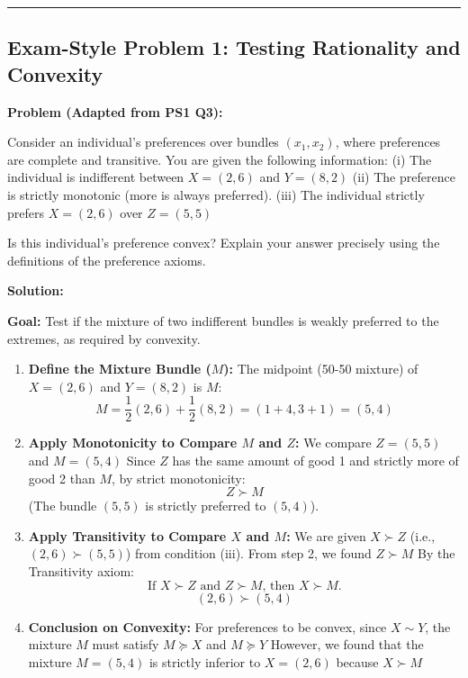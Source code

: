 \documentclass{article}
\begin{document}
\noindent\rule{\textwidth}{0.4pt}

\subsection*{Exam-Style Problem 1: Testing Rationality and Convexity}

\textbf{Problem (Adapted from PS1 Q3):}

Consider an individual's preferences over bundles $(x_1, x_2)$, where preferences are complete and transitive. You are given the following information: (i) The individual is indifferent between $X = (2, 6)$ and $Y = (8, 2)$ (ii) The preference is strictly monotonic (more is always preferred). (iii) The individual strictly prefers $X = (2, 6)$ over $Z = (5, 5)$

Is this individual's preference convex? Explain your answer precisely using the definitions of the preference axioms.

\textbf{Solution:}

\textbf{Goal:} Test if the mixture of two indifferent bundles is weakly preferred to the extremes, as required by convexity.

\begin{enumerate}
    \item \textbf{Define the Mixture Bundle ($M$):} The midpoint (50-50 mixture) of $X=(2, 6)$ and $Y=(8, 2)$ is $M$: \[M = \frac{1}{2}(2, 6) + \frac{1}{2}(8, 2) = (1+4, 3+1) = (5, 4)\]
    \item \textbf{Apply Monotonicity to Compare $M$ and $Z$:} We compare $Z=(5, 5)$ and $M=(5, 4)$ Since $Z$ has the same amount of good 1 and strictly more of good 2 than $M$, by strict monotonicity: \[Z \succ M\] (The bundle $(5, 5)$ is strictly preferred to $(5, 4)$).
    \item \textbf{Apply Transitivity to Compare $X$ and $M$:} We are given $X \succ Z$ (i.e., $(2, 6) \succ (5, 5)$) from condition (iii). From step 2, we found $Z \succ M$ By the Transitivity axiom: \[\text{If } X \succ Z \text{ and } Z \succ M \text{, then } X \succ M.\] \[(2, 6) \succ (5, 4)\]
    \item \textbf{Conclusion on Convexity:} For preferences to be convex, since $X \sim Y$, the mixture $M$ must satisfy $M \succeq X$ and $M \succeq Y$ However, we found that the mixture $M=(5, 4)$ is strictly inferior to $X=(2, 6)$ because $X \succ M$
\end{enumerate}
\end{document}
